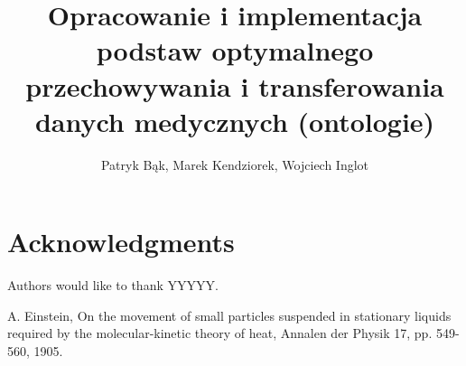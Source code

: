 \documentclass{llncs}
\begin{document}
\title{Opracowanie i implementacja podstaw optymalnego przechowywania i transferowania danych medycznych (ontologie)}

\author{Patryk Bąk, Marek Kendziorek, Wojciech Inglot}

\maketitle




\begin{multicols}{2}







\end{multicols}

\section*{Acknowledgments}\label{sec:Acknowledgments}

Authors would like to thank YYYYY.

\begin{thebibliography}{1}

A. Einstein, On the movement of small particles suspended in stationary liquids required by the molecular-kinetic theory of heat, Annalen der Physik 17, pp. 549-560, 1905.

\end{thebibliography}
\end{document}
